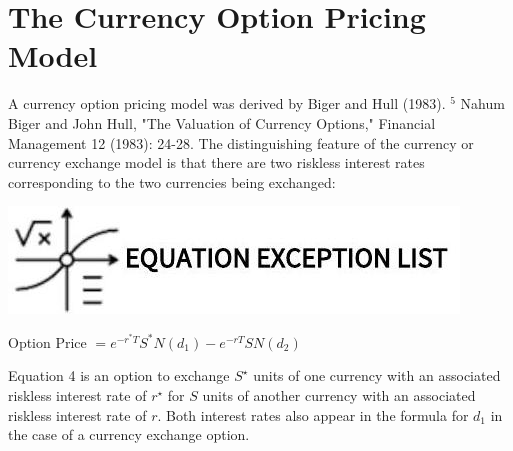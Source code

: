 \documentclass[11pt]{article}
\begin{document}
\section*{The Currency Option Pricing Model}
A currency option pricing model was derived by Biger and Hull (1983). ${ }^{5}$ Nahum Biger and John Hull, "The Valuation of Currency Options," Financial Management 12 (1983): 24-28. The distinguishing feature of the currency or currency exchange model is that there are two riskless interest rates corresponding to the two currencies being exchanged:

\begin{center}
\includegraphics[max width=\textwidth]{2024_04_11_7c728ae44168a8fb26cag-3(1)}
\end{center}

Option Price $=e^{-r^{*} T} S^{*} N\left(d_{1}\right)-e^{-r T} S N\left(d_{2}\right)$

Equation 4 is an option to exchange $S^{\star}$ units of one currency with an associated riskless interest rate of $r^{\star}$ for $S$ units of another currency with an associated riskless interest rate of $r$. Both interest rates also appear in the formula for $d_{1}$ in the case of a currency exchange option.
\end{document}

